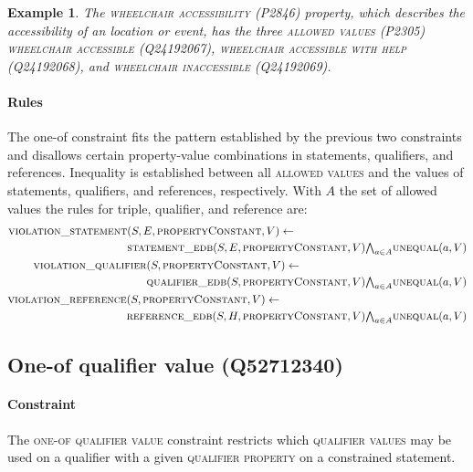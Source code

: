 \documentclass[hyperref,bachelorofscience,fleqn]{cgvpub}
\newtheorem{example}{Example}
\begin{document}
\begin{example}
The \textsc{wheelchair accessibility} (P2846) property, which describes the accessibility of an location or event, has the three \textsc{allowed values} (P2305) \textsc{wheelchair accessible} (Q24192067), \textsc{wheelchair accessible with help} (Q24192068), and \textsc{wheelchair inaccessible} (Q24192069).
\end{example}

\paragraph{Rules}
The one-of constraint fits the pattern established by the previous two constraints and disallows certain property-value combinations in statements, qualifiers, and references. Inequality is established between all \textsc{allowed values} and the values of statements, qualifiers, and references, respectively. With \(A\) the set of allowed values the rules for triple, qualifier, and reference are:
\begin{align}
\begin{split}
\textsc{violation\_statement}&(S, E, \textsc{propertyConstant}, V) \leftarrow \\
&\textsc{statement\_edb}(S, E, \textsc{propertyConstant}, V) {\textstyle\bigwedge}_{a \in A} \textsc{unequal}(a, V)
\end{split}\\
\begin{split}
\textsc{violation\_qualifier}&(S, \textsc{propertyConstant}, V) \leftarrow \\
&\textsc{qualifier\_edb}(S, \textsc{propertyConstant}, V) {\textstyle\bigwedge}_{a \in A} \textsc{unequal}(a, V)
\end{split}\\
\begin{split}
\textsc{violation\_reference}&(S, \textsc{propertyConstant}, V) \leftarrow \\
&\textsc{reference\_edb}(S, H, \textsc{propertyConstant}, V) {\textstyle\bigwedge}_{a \in A} \textsc{unequal}(a, V)
\end{split}
\end{align}

\subsection{One-of qualifier value (Q52712340)}
\paragraph{Constraint}
The \textsc{one-of qualifier value} constraint restricts which \textsc{qualifier values} may be used on a qualifier with a given \textsc{qualifier property} on a constrained statement.
\end{document}
